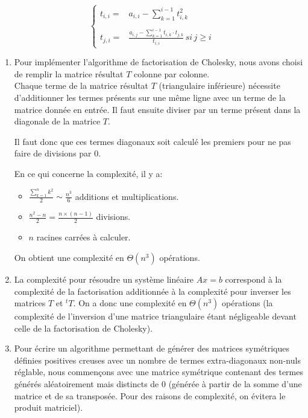 \documentclass{article}
\begin{document}
\[\left\lbrace
\begin{array}{lll} t_{i,i} = & a_{i,i} - \sum_{k=1}^{i-1}t_{i,k}^{2} \\
\\
t_{j,i} = & \frac{a_{i,j} - \sum_{k=1}^{i-1}t_{i,k} \cdot t_{j,k}}{t_{i,i}}\,si\,j \geq i
\end{array}\right.\]
\begin{enumerate}

\item Pour implémenter l'algorithme de factorisation de Cholesky, nous avons choisi de remplir la matrice résultat $T$ colonne par colonne.\\
Chaque terme de la matrice résultat $T$ (triangulaire inférieure) nécessite d'additionner les termes présents sur une même ligne avec un terme de la matrice donnée en entrée. Il faut ensuite diviser par un terme présent dans la diagonale de la matrice $T$.

Il faut donc que ces termes diagonaux soit calculé les premiers pour ne pas faire de divisions par $0$.

En ce qui concerne la complexité, il y a:
\begin{itemize}
\item $\frac{\sum_{k=1}^{n} k^{2}}{2} \sim \frac{n^3}{6}$ additions et multiplications.
\item $\frac{n^{2} - n}{2} = \frac{n \times(n-1)}{2}$ divisions.
\item $n$ racines carrées à calculer.
\end{itemize}

On obtient une complexité en $\Theta(n^3)$ opérations.

\item La complexité pour résoudre un système linéaire $Ax = b$ correspond à la complexité de la factorisation additionnée à la complexité pour inverser les matrices $T$ et ${}^tT$. On a donc une complexité en $\Theta(n^3)$ opérations (la complexité de l'inversion d'une matrice triangulaire étant négligeable devant celle de la factorisation de Cholesky).

\item Pour écrire un algorithme permettant de générer des matrices symétriques définies positives creuses avec un nombre de termes extra-diagonaux non-nuls réglable, nous commençons avec une matrice symétrique contenant des termes générés aléatoirement mais distincts de $0$ (générée à partir de la somme d'une matrice et de sa transposée. Pour des raisons de complexité, on évitera le produit matriciel).


\end{enumerate}
\end{document}

